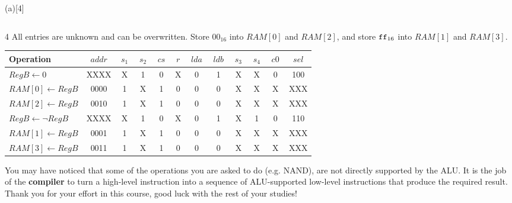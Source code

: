 \begin{question}{(a)}[4]
{\begin{Questions}
\begin{tabular}{p{4.7cm} | c | c | c | c | c | c | c | c | c | c | c}
  \end{tabular}
 \end{Questions}
 }
 \item[4] All entries are unknown and can be overwritten. Store $00_{16}$ into $RAM\left[0\right]$ and $RAM\left[2\right]$, and store ${\tt ff}_{16}$ into $RAM\left[1\right]$ and $RAM\left[3\right]$.\\
 {\color{NavyBlue}
 \begin{Questions}
  \begin{tabular}{p{4.3cm} | c | c | c | c | c | c | c | c | c | c | c}
  Operation & $\, addr \,$ & $\, s_1 \,$ & $\, s_2 \,$ & $\, cs \,$ & $\, r \,$ & $\, lda \,$ & $\, ldb \,$ & $\, s_3 \,$ & $\, s_4 \,$ & $\, c0 \,$ & $\, sel \,$ \\  

  \hline
  $RegB \leftarrow 0 $ & XXXX & X & 1 & 0 & X & 0 & 1 & X & X & 0 & 100 \\
  $ RAM\left[0\right] \leftarrow RegB$ & 0000 & 1 & X & 1 & 0 & 0 & 0 & X & X & X & XXX \\
  $ RAM\left[2\right] \leftarrow RegB$ & 0010 & 1 & X & 1 & 0 & 0 & 0 & X & X & X & XXX \\
  $RegB \leftarrow \lnot RegB $ & XXXX & X & 1 & 0 & X & 0 & 1 & X & 1 & 0 & 110 \\
  $ RAM\left[1\right] \leftarrow RegB$ & 0001 & 1 & X & 1 & 0 & 0 & 0 & X & X & X & XXX \\
  $ RAM\left[3\right] \leftarrow RegB$ & 0011 & 1 & X & 1 & 0 & 0 & 0 & X & X & X & XXX \\
  \end{tabular}
 \end{Questions}
 }
 \vspace{2.0cm}
 
You may have noticed that some of the operations you are asked to do (e.g. NAND), are not directly supported by the ALU. It is the job of the \textbf{compiler} to turn a high-level instruction into a sequence of ALU-supported low-level instructions that produce the required result. Thank you for your effort in this course, good luck with the rest of your studies!

\end{question}